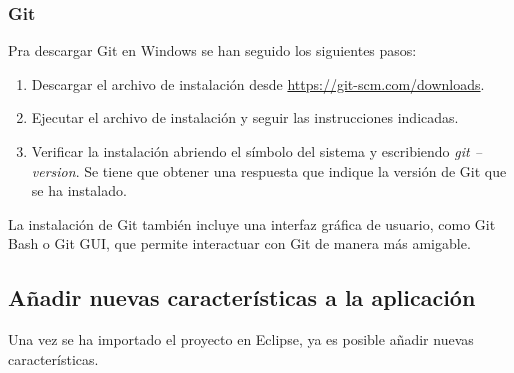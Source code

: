 \subsubsection{Git}
Pra descargar Git en Windows se han seguido los siguientes pasos:
\begin{enumerate}
    \item Descargar el archivo de instalación desde \url{https://git-scm.com/downloads}. 
    \item Ejecutar el archivo de instalación y seguir las instrucciones indicadas.
    \item Verificar la instalación abriendo el símbolo del sistema y escribiendo \textit{git --version}. Se tiene que obtener una respuesta que indique la versión de Git que se ha instalado.
\end{enumerate}
La instalación de Git también incluye una interfaz gráfica de usuario, como Git Bash o Git GUI, que permite interactuar con Git de manera más amigable.

\subsection{Añadir nuevas características a la aplicación}

Una vez se ha importado el proyecto en Eclipse, ya es posible añadir nuevas características.

